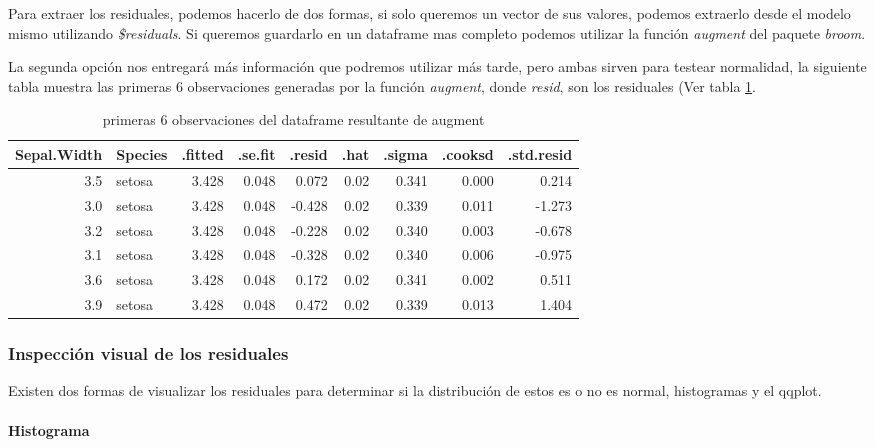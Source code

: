 \documentclass[]{book}
\let\oldparagraph\paragraph
\renewcommand{\paragraph}[1]{\oldparagraph{#1}\mbox{}}
\begin{document}
Para extraer los residuales, podemos hacerlo de dos formas, si solo
queremos un vector de sus valores, podemos extraerlo desde el modelo
mismo utilizando \emph{\$residuals}. Si queremos guardarlo en un
dataframe mas completo podemos utilizar la función \emph{augment} del
paquete \emph{broom}.

La segunda opción nos entregará más información que podremos utilizar
más tarde, pero ambas sirven para testear normalidad, la siguiente tabla
muestra las primeras 6 observaciones generadas por la función
\emph{augment}, donde \emph{resid}, son los residuales (Ver tabla
\ref{tab:TabResid}.

\begin{table}

\caption{\label{tab:TabResid}primeras 6 observaciones del dataframe resultante de augment}
\centering
\begin{tabular}[t]{r|l|r|r|r|r|r|r|r}
\hline
Sepal.Width & Species & .fitted & .se.fit & .resid & .hat & .sigma & .cooksd & .std.resid\\
\hline
3.5 & setosa & 3.428 & 0.048 & 0.072 & 0.02 & 0.341 & 0.000 & 0.214\\
\hline
3.0 & setosa & 3.428 & 0.048 & -0.428 & 0.02 & 0.339 & 0.011 & -1.273\\
\hline
3.2 & setosa & 3.428 & 0.048 & -0.228 & 0.02 & 0.340 & 0.003 & -0.678\\
\hline
3.1 & setosa & 3.428 & 0.048 & -0.328 & 0.02 & 0.340 & 0.006 & -0.975\\
\hline
3.6 & setosa & 3.428 & 0.048 & 0.172 & 0.02 & 0.341 & 0.002 & 0.511\\
\hline
3.9 & setosa & 3.428 & 0.048 & 0.472 & 0.02 & 0.339 & 0.013 & 1.404\\
\hline
\end{tabular}
\end{table}

\subsubsection{Inspección visual de los
residuales}\label{inspeccion-visual-de-los-residuales}

Existen dos formas de visualizar los residuales para determinar si la
distribución de estos es o no es normal, histogramas y el qqplot.

\paragraph{Histograma}\label{histograma}
\end{document}
